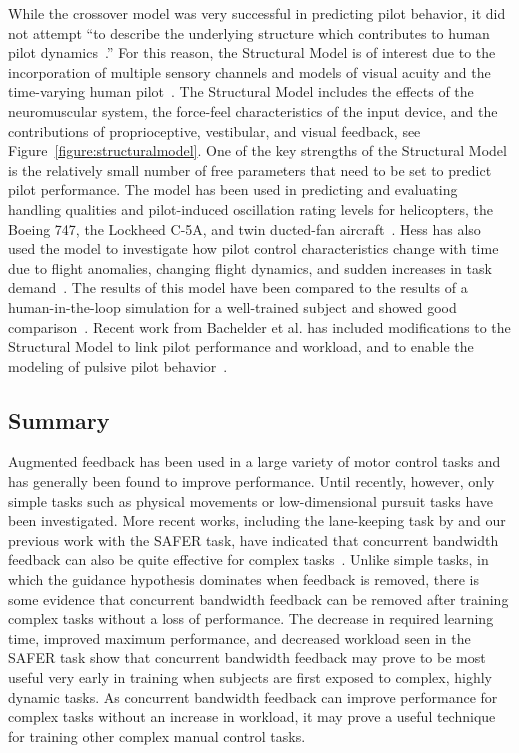 While the crossover model was very successful in predicting pilot behavior, it did not attempt ``to describe the underlying structure which contributes to human pilot dynamics~\citep{hess_structural_1980}.''
For this reason, the Structural Model is of interest due to the incorporation of multiple sensory channels and models of visual acuity and the time-varying human pilot~\citep{hess_modeling_2009}.
The Structural Model includes the effects of the neuromuscular system, the force-feel characteristics of the input device, and the contributions of proprioceptive, vestibular, and visual feedback, see Figure~\ref{figure:structuralmodel}.
One of the key strengths of the Structural Model is the relatively small number of free parameters that need to be set to predict pilot performance.
The model has been used in predicting and evaluating handling qualities and pilot-induced oscillation rating levels for helicopters, the Boeing 747, the Lockheed C-5A, and twin ducted-fan aircraft~\citep{hess_analytical_2013, andreea-irina_prediction_2014, grant_handling_2015}.
Hess has also used the model to investigate how pilot control characteristics change with time due to flight anomalies, changing flight dynamics, and sudden increases in task demand~\citep{hess_modeling_2009, hess_modeling_2016}.
The results of this model have been compared to the results of a human-in-the-loop simulation for a well-trained subject and showed good comparison~\citep{hess_modeling_2016}.
Recent work from Bachelder et al. has included modifications to the Structural Model to link pilot performance and workload, and to enable the modeling of pulsive pilot behavior~\citep{bachelder_modeling_2017, bachelder_linking_2018}.

\subsection{Summary}
Augmented feedback has been used in a large variety of motor control tasks and has generally been found to improve performance.
Until recently, however, only simple tasks such as physical movements or low-dimensional pursuit tasks have been investigated.
More recent works, including the lane-keeping task by \citeauthor{de_groot_effect_2011} and our previous work with the SAFER task, have indicated that concurrent bandwidth feedback can also be quite effective for complex tasks~\citep{karasinski_real-time_2017}.
Unlike simple tasks, in which the guidance hypothesis dominates when feedback is removed, there is some evidence that concurrent bandwidth feedback can be removed after training complex tasks without a loss of performance.
The decrease in required learning time, improved maximum performance, and decreased workload seen in the SAFER task show that concurrent bandwidth feedback may prove to be most useful very early in training when subjects are first exposed to complex, highly dynamic tasks.
As concurrent bandwidth feedback can improve performance for complex tasks without an increase in workload, it may prove a useful technique for training other complex manual control tasks.

